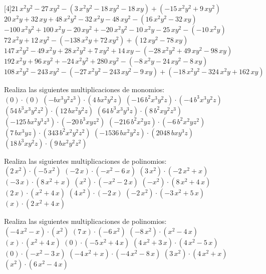 [4]\quad$ 21 \, x^{2} y^{2} - 27 \, x y^{2} - ( 3 \, x^{2} y^{2} - 18 \, x y^{2} - 18 \, x y ) + ( -15 \, x^{2} y^{2} + 9 \, x y^{2} ) $ \subitem [5]\quad$ 20 \, x^{2} y + 32 \, x y + 48 \, x^{2} y^{2} - 32 \, x^{2} y - 48 \, x y^{2} - ( 16 \, x^{2} y^{2} - 32 \, x y ) $ \subitem [6]\quad$ -100 \, x^{2} y^{2} + 100 \, x^{2} y - 20 \, x y^{2} + -20 \, x^{2} y^{2} - 10 \, x^{2} y - 25 \, x y^{2} - ( -10 \, x^{2} y ) $ \subitem [7]\quad$ 72 \, x^{2} y + 12 \, x y^{2} - ( -138 \, x^{2} y + 72 \, x y^{2} ) + ( 12 \, x y^{2} - 78 \, x y ) $ \subitem [8]\quad$ 147 \, x^{2} y^{2} - 49 \, x^{2} y + 28 \, x^{2} y^{2} + 7 \, x y^{2} + 14 \, x y - ( -28 \, x^{2} y^{2} + 49 \, x y^{2} - 98 \, x y ) $ \subitem [9]\quad$ 192 \, x^{2} y + 96 \, x y^{2} + -24 \, x^{2} y^{2} + 280 \, x y^{2} - ( -8 \, x^{2} y - 24 \, x y^{2} - 8 \, x y ) $ \subitem [10]\quad$ 108 \, x^{2} y^{2} - 243 \, x y^{2} - ( -27 \, x^{2} y^{2} - 243 \, x y^{2} - 9 \, x y ) + ( -18 \, x^{2} y^{2} - 324 \, x^{2} y + 162 \, x y ) $ \item[Ejercicio 3:] Realiza las siguientes multiplicaciones de monomios: \\ \subitem [1]\quad$ ( 0 ) · ( 0 )$ \subitem [2]\quad$ ( -b x^{3} y^{2} z^{3} ) · ( 4 \, b x^{2} y^{2} z )$ \subitem [3]\quad$ ( -16 \, b^{2} x^{3} y^{2} z ) · ( -4 \, b^{3} x^{3} y^{2} z )$ \subitem [4]\quad$ ( 54 \, b^{3} x^{3} y^{2} z^{2} ) · ( 12 \, b x^{2} y^{2} z )$ \subitem [5]\quad$ ( 64 \, b^{3} x^{3} y^{3} z ) · ( 8 \, b^{2} x y^{2} z^{3} )$ \subitem [6]\quad$ ( -125 \, b x^{2} y^{3} z^{3} ) · ( -20 \, b^{3} x y z^{2} )$ \subitem [7]\quad$ ( -216 \, b^{2} x^{2} y z ) · ( -6 \, b^{2} x^{2} y z^{2} )$ \subitem [8]\quad$ ( 7 \, b x^{3} y z ) · ( 343 \, b^{2} x^{2} y^{2} z^{2} )$ \subitem [9]\quad$ ( -1536 \, b x^{2} y^{2} z ) · ( 2048 \, b x y^{3} z )$ \subitem [10]\quad$ ( 18 \, b^{3} x y^{2} z ) · ( 9 \, b x^{2} y^{2} z^{2} )$ \item[Ejercicio 4:] Realiza las siguientes multiplicaciones de polinomios: \\ \subitem [1]\quad$ ( 2 \, x^{2} ) · ( -5 \, x^{2} )$ \subitem [2]\quad$ ( -2 \, x ) · ( -x^{2} - 6 \, x )$ \subitem [3]\quad$ ( 3 \, x^{2} ) · ( -2 \, x^{2} + x )$ \subitem [4]\quad$ ( -3 \, x ) · ( 8 \, x^{2} + x )$ \subitem [5]\quad$ ( x^{2} ) · ( -x^{2} - 2 \, x )$ \subitem [6]\quad$ ( -x^{2} ) · ( 8 \, x^{2} + 4 \, x )$ \subitem [7]\quad$ ( 2 \, x ) · ( x^{2} + 4 \, x )$ \subitem [8]\quad$ ( 4 \, x^{2} ) · ( -2 \, x )$ \subitem [9]\quad$ ( -2 \, x^{2} ) · ( -3 \, x^{2} + 5 \, x )$ \subitem [10]\quad$ ( x ) · ( 2 \, x^{2} + 4 \, x )$ \item[Ejercicio 5:] Realiza las siguientes multiplicaciones de polinomios: \\ \subitem [1]\quad$ ( -4 \, x^{2} - x ) · ( x^{2} )$ \subitem [2]\quad$ ( 7 \, x ) · ( -6 \, x^{2} )$ \subitem [3]\quad$ ( -8 \, x^{2} ) · ( x^{2} - 4 \, x )$ \subitem [4]\quad$ ( x ) · ( x^{2} + 4 \, x )$ \subitem [5]\quad$ ( 0 ) · ( -5 \, x^{2} + 4 \, x )$ \subitem [6]\quad$ ( 4 \, x^{2} + 3 \, x ) · ( 4 \, x^{2} - 5 \, x )$ \subitem [7]\quad$ ( 0 ) · ( -x^{2} - 3 \, x )$ \subitem [8]\quad$ ( -4 \, x^{2} + x ) · ( -4 \, x^{2} - 8 \, x )$ \subitem [9]\quad$ ( 3 \, x^{2} ) · ( 4 \, x^{2} + x )$ \subitem [10]\quad$ ( x^{2} ) · ( 6 \, x^{2} - 4 \, x )$ \subitem 